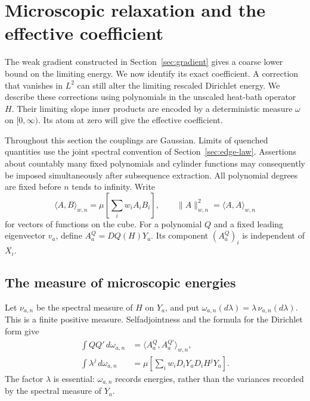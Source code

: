 \section{Microscopic relaxation and the effective coefficient}
\label{sec:microscopic}

The weak gradient constructed in Section~\ref{sec:gradient} gives a coarse
lower bound on the limiting energy. We now identify its exact coefficient.
A correction that vanishes in $L^2$ can still alter the limiting rescaled
Dirichlet energy. We describe these corrections using polynomials in the unscaled
heat-bath operator $H$. Their limiting slope inner products are encoded by
a deterministic measure $\omega$ on $[0,\infty)$. Its atom at zero will
give the effective coefficient.

Throughout this section the couplings are Gaussian. Limits of quenched
quantities use the joint spectral convention of Section~\ref{sec:edge-law}.
Assertions about countably many fixed polynomials and cylinder functions
may consequently be imposed simultaneously after subsequence extraction.
All polynomial degrees are fixed before $n$ tends to infinity. Write
\[
 \langle A,B\rangle_{w,n}
   =\mu\!\left[\sum_i w_iA_iB_i\right],
 \qquad \|A\|_{w,n}^2=\langle A,A\rangle_{w,n}
\]
for vectors of functions on the cube. For a polynomial $Q$ and a fixed
leading eigenvector $v_a$, define $A_a^Q=DQ(H)Y_a$. Its component
$(A_a^Q)_i$ is independent of $X_i$.

\subsection{The measure of microscopic energies}

Let $\nu_{a,n}$ be the spectral measure of $H$ on $Y_a$, and put
$\omega_{a,n}(d\lambda)=\lambda\,\nu_{a,n}(d\lambda)$. This is a finite
positive measure. Selfadjointness and the formula for the Dirichlet form give
\begin{align}
 \int QQ'\,d\omega_{a,n}
   &=\langle A_a^Q,A_a^{Q'}\rangle_{w,n},
       \label{eq:micro-finite-measure}\\
 \int\lambda^j\,d\omega_{a,n}
   &=\mu\!\left[\sum_iw_iD_iY_aD_iH^jY_a\right].
       \label{eq:micro-finite-moments}
\end{align}
The factor $\lambda$ is essential: $\omega_{a,n}$ records energies, rather
than the variances recorded by the spectral measure of $Y_a$.

